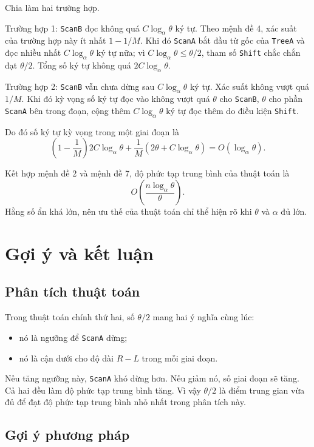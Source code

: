 \documentclass[11pt]{article}
\begin{document}
Chia làm hai trường hợp.

Trường hợp 1: \texttt{ScanB} đọc không quá $C\log_\alpha\theta$ ký tự. Theo
mệnh đề 4, xác suất của trường hợp này ít nhất $1-1/M$. Khi đó \texttt{ScanA}
bắt đầu từ gốc của \texttt{TreeA} và đọc nhiều nhất
$C\log_\alpha\theta$ ký tự nữa; vì
$C\log_\alpha\theta\le\theta/2$, tham số \texttt{Shift} chắc chắn đạt
$\theta/2$. Tổng số ký tự không quá $2C\log_\alpha\theta$.

Trường hợp 2: \texttt{ScanB} vẫn chưa dừng sau
$C\log_\alpha\theta$ ký tự. Xác suất không vượt quá $1/M$. Khi đó kỳ vọng số
ký tự đọc vào không vượt quá $\theta$ cho \texttt{ScanB}, $\theta$ cho phần
\texttt{ScanA} bên trong đoạn, cộng thêm $C\log_\alpha\theta$ ký tự đọc thêm
do điều kiện \texttt{Shift}.

Do đó số ký tự kỳ vọng trong một giai đoạn là
\[
  \left(1-\frac1M\right)2C\log_\alpha\theta
  +\frac1M\left(2\theta+C\log_\alpha\theta\right)
  =O(\log_\alpha\theta).
\]

Kết hợp mệnh đề 2 và mệnh đề 7, độ phức tạp trung bình của thuật toán là
\[
  O\left(\frac{n\log_\alpha\theta}{\theta}\right).
\]
Hằng số ẩn khá lớn, nên ưu thế của thuật toán chỉ thể hiện rõ khi $\theta$ và
$\alpha$ đủ lớn.

\section{Gợi ý và kết luận}

\subsection{Phân tích thuật toán}

Trong thuật toán chính thứ hai, số $\theta/2$ mang hai ý nghĩa cùng lúc:
\begin{itemize}
  \item nó là ngưỡng để \texttt{ScanA} dừng;
  \item nó là cận dưới cho độ dài $R-L$ trong mỗi giai đoạn.
\end{itemize}

Nếu tăng ngưỡng này, \texttt{ScanA} khó dừng hơn. Nếu giảm nó, số giai đoạn sẽ
tăng. Cả hai đều làm độ phức tạp trung bình tăng. Vì vậy $\theta/2$ là điểm
trung gian vừa đủ để đạt độ phức tạp trung bình nhỏ nhất trong phân tích này.

\subsection{Gợi ý phương pháp}
\end{document}
